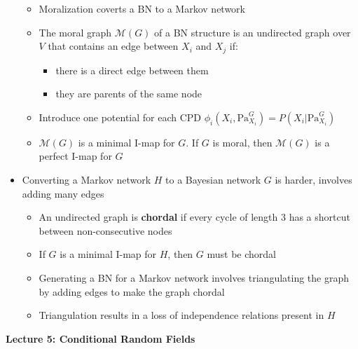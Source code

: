 \documentclass{article}
\begin{document}
\begin{itemize}
\begin{itemize}
        \item Moralization coverts a BN to a Markov network 
        \item The moral graph $\mathcal{M}(G)$ of a BN structure is an undirected graph over $V$ that contains an edge between $X_i$ and $X_j$ if:\begin{itemize}
            \item there is a direct edge between them 
            \item they are parents of the same node 
        \end{itemize}
        \item Introduce one potential for each CPD $\phi_i(X_i, \text{Pa}_{X_i}^G) = P(X_i | \text{Pa}_{X_i}^G)$
        \item $\mathcal{M}(G)$ is a minimal I-map for $G$. If $G$ is moral, then $\mathcal{M}(G)$ is a perfect I-map for $G$
    \end{itemize}
    \item Converting a Markov network $H$ to a Bayesian network $G$ is harder, involves adding many edges \begin{itemize}
        \item An undirected graph is \textbf{chordal} if every cycle of length 3 has a shortcut between non-consecutive nodes 
        \item If $G$ is a minimal I-map for $H$, then $G$ must be chordal 
        \item Generating a BN for a Markov network involves triangulating the graph by adding edges to make the graph chordal 
        \item Triangulation results in a loss of independence relations present in $H$
    \end{itemize}
\end{itemize}
\textbf{Lecture 5: Conditional Random Fields}
\end{document}
